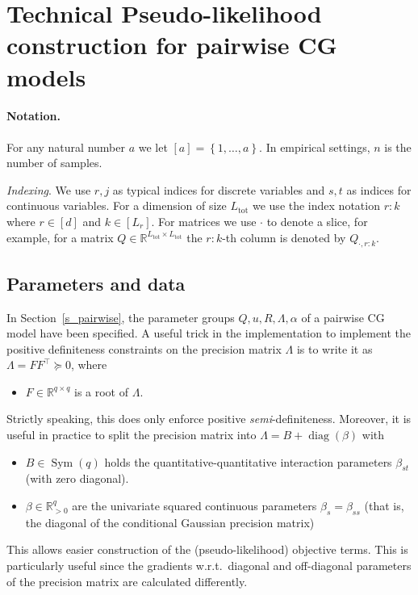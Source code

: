 \documentclass{article}
\def\tot{\text{tot}}
\newcommand{\IR}{{\mathbb{R}}}\newcommand{\IN}{{\mathbb{N}}}
\newcommand{\bPc}[1]{\ensuremath{\left\{#1 \right\}}} %
\DeclareMathOperator{\diag}{diag}
\DeclareMathOperator{\Sym}{Sym}
\begin{document}



\appendix

\section{Technical Pseudo-likelihood construction for pairwise CG models}
\label{app_plh}



\paragraph{Notation.}


For any natural number $a$ we let $[a] =\bPc{1,\ldots, a}$.
In empirical settings, $n$ is the number of samples.
\medskip

\emph{Indexing}.
We use $r,j$ as typical indices for discrete variables and $s,t$ as indices for continuous variables. For a dimension of size $L_{\tot}$ we use the index notation $r:k$ where $r\in[d]$ and $k\in[L_r]$. For matrices we use $\cdot$ to denote a slice, for example, for a matrix $Q \in \IR^{ L_{\tot}\times  L_{\tot}}$ the $r:k$-th column is denoted by $Q_{\cdot, r:k}$.

\label{s_cg_pw_plhmodsel}
\subsection{Parameters and data}

In Section~\ref{s_pairwise}, the parameter groups $Q, u, R, \Lambda, \alpha$ of a pairwise CG model have been specified.
A useful trick in the implementation to implement the positive definiteness constraints on the precision matrix $\Lambda$ is to write it as $\Lambda = F F^\top\succeq0$, 
where
\begin{itemize}
	\item $F\in\IR^{q\times q}$ is a root of $\Lambda$.
\end{itemize}
Strictly speaking, this does only enforce positive \emph{semi}-definiteness.
Moreover, it is useful in practice to split the precision matrix into $\Lambda = B + \diag(\beta)$ with
\begin{itemize}
	\item $B\in\Sym(q)$ holds the quantitative-quantitative interaction parameters $\beta_{st}$ (with zero diagonal).
	\item $\beta\in\IR^{q}_{>0}$ are the univariate squared continuous parameters $\beta_s=\beta_{ss}$ (that is, the diagonal of the conditional Gaussian precision matrix)
\end{itemize}
This allows easier construction of the (pseudo-likelihood) objective terms.
This is particularly useful since the gradients w.r.t.~diagonal and off-diagonal parameters of the precision matrix are calculated differently.
\medskip
\end{document}
